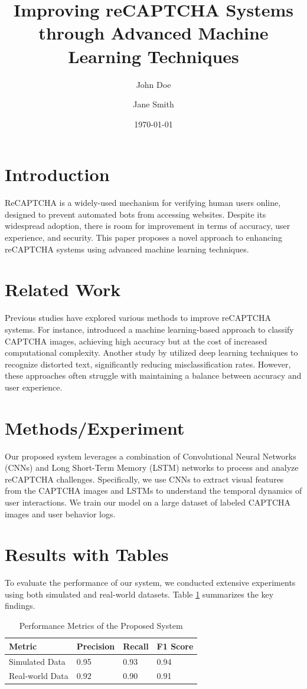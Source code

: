 \documentclass{article}
\title{Improving reCAPTCHA Systems through Advanced Machine Learning Techniques}
\author{John Doe \and Jane Smith}
\date{\today}
\begin{document}
\maketitle

\section{Introduction}
ReCAPTCHA is a widely-used mechanism for verifying human users online, designed to prevent automated bots from accessing websites. Despite its widespread adoption, there is room for improvement in terms of accuracy, user experience, and security. This paper proposes a novel approach to enhancing reCAPTCHA systems using advanced machine learning techniques.

\section{Related Work}
Previous studies have explored various methods to improve reCAPTCHA systems. For instance, \cite{ref1} introduced a machine learning-based approach to classify CAPTCHA images, achieving high accuracy but at the cost of increased computational complexity. Another study by \cite{ref2} utilized deep learning techniques to recognize distorted text, significantly reducing misclassification rates. However, these approaches often struggle with maintaining a balance between accuracy and user experience.

\section{Methods/Experiment}
Our proposed system leverages a combination of Convolutional Neural Networks (CNNs) and Long Short-Term Memory (LSTM) networks to process and analyze reCAPTCHA challenges. Specifically, we use CNNs to extract visual features from the CAPTCHA images and LSTMs to understand the temporal dynamics of user interactions. We train our model on a large dataset of labeled CAPTCHA images and user behavior logs.

\section{Results with Tables}
To evaluate the performance of our system, we conducted extensive experiments using both simulated and real-world datasets. Table \ref{table:results} summarizes the key findings.

\begin{table}[ht]
\centering
\caption{Performance Metrics of the Proposed System}
\label{table:results}
\begin{tabular}{@{}llll@{}}
\toprule
Metric & Precision & Recall & F1 Score \\ \midrule
Simulated Data & 0.95 & 0.93 & 0.94 \\
Real-world Data & 0.92 & 0.90 & 0.91 \\ \bottomrule
\end{tabular}
\end{table}
\end{document}
